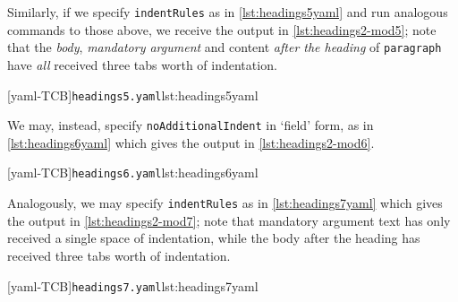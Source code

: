  \begin{example}
 Similarly, if we specify \texttt{indentRules} as in \cref{lst:headings5yaml} and run
 analogous commands to those above, we receive the output in \cref{lst:headings2-mod5};
 note that the \emph{body}, \emph{mandatory argument} and content \emph{after the
 heading} of \texttt{paragraph} have \emph{all} received three tabs worth of indentation.

 \begin{cmhtcbraster}[raster force size=false,
   raster column 1/.style={add to width=1cm},
   raster column 2/.style={add to width=-1cm},
  ]
  [yaml-TCB]{\texttt{headings5.yaml}}{lst:headings5yaml}
 \end{cmhtcbraster}
 \end{example}

 \begin{example}
 We may, instead, specify \texttt{noAdditionalIndent} in `field' form, as in
 \cref{lst:headings6yaml} which gives the output in \cref{lst:headings2-mod6}.

 \begin{cmhtcbraster}
  [yaml-TCB]{\texttt{headings6.yaml}}{lst:headings6yaml}
 \end{cmhtcbraster}
 \end{example}

 \begin{example}
 Analogously, we may specify \texttt{indentRules} as in \cref{lst:headings7yaml} which
 gives the output in \cref{lst:headings2-mod7}; note that mandatory argument text has
 only received a single space of indentation, while the body after the heading has
 received three tabs worth of indentation.

 \begin{cmhtcbraster}
  [yaml-TCB]{\texttt{headings7.yaml}}{lst:headings7yaml}
 \end{cmhtcbraster}
 \end{example}

